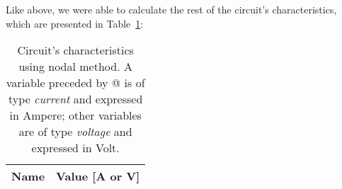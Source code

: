 Like above, we were able to calculate the rest of the circuit's characteristics, which are presented in Table~\ref{tab:nodetab}:

\begin{table}[H]
  \centering
  \begin{tabular}{|l|r|}
    \hline    
    {\bf Name} & {\bf Value [A or V]} \\ \hline
    
  \end{tabular}
  \caption{Circuit's characteristics using nodal method. A variable preceded by @ is of type {\em current}
    and expressed in Ampere; other variables are of type {\it voltage} and expressed in
    Volt.}
  \label{tab:nodetab}
\end{table}
















